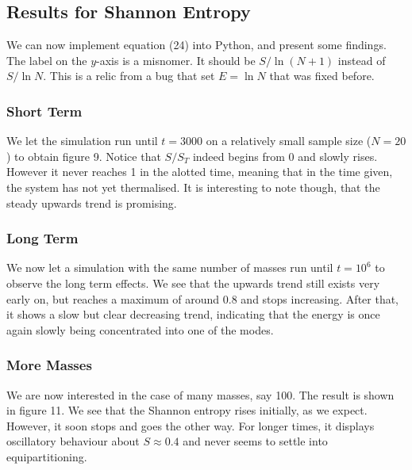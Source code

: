 \documentclass{article}
\begin{document}
\subsection{Results for Shannon Entropy}
We can now implement equation (24) into Python, and present some findings.
 The label on the $y$-axis is a misnomer. 
It should be $S/\ln(N+1)$ instead of $S/\ln N$. This is a relic
from a bug that set $E=\ln N$ that was fixed before. 
\subsubsection{Short Term}
We let the simulation run until $t=3000$ on a relatively small sample size ($N=20$) to obtain figure 9. Notice that $S/S_T$ indeed 
begins from 0 and slowly rises. However it never reaches 1 in the alotted time, 
meaning that in the time given, the system has not yet thermalised. It is interesting to note though, 
that the steady upwards trend is promising.
\subsubsection{Long Term}
We now let a simulation with the same number of masses run until $t=10^6$ to observe the long term effects.
 We see that the upwards trend 
still exists very early on, but reaches a maximum of around 0.8 and stops increasing. After that, it shows a slow but clear decreasing trend, indicating that 
the energy is once again slowly being concentrated into one of the modes. 
\subsubsection{More Masses}
We are now interested in the case of many masses, say 100. The result is shown in figure 11.
We see that the Shannon entropy rises initially, as we expect. However, it soon stops and goes the other way. 
For longer times, it displays oscillatory behaviour about $S\approx0.4$ and never seems to settle into equipartitioning. 
\end{document}
